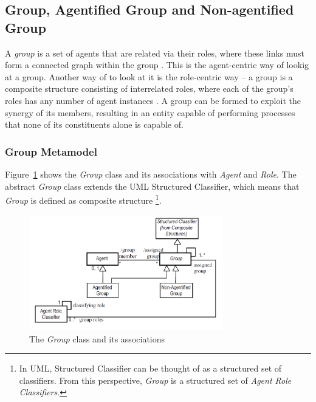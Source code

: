 \subsection{Group, Agentified Group and Non-agentified Group}

A \textit{group} is a set of agents that are related via their roles, where these links must form
a connected graph within the group \cite{Odell05}.
This is the agent-centric way of lookig at a group.
Another way of to look at it is the role-centric way -- a group is a composite structure consisting of interrelated roles, where each of the group's roles has any number of agent instances \cite{Odell05}.
A group can be formed to exploit the synergy of its members, resulting in an entity capable of performing processes that none of its constituents alone is capable of.

\subsubsection*{Group Metamodel}

Figure~\ref{figure:onp-group} shows the \textit{Group} class and its associations with \textit{Agent} and \textit{Role}.
The abstract \textit{Group} class extends the UML Structured Classifier, which means that \textit{Group} is defined as composite structure
\footnote{In UML, Structured Classifier can be thought of as a structured set of classifiers. From this perspective, \textit{Group} is a structured set of \textit{Agent Role Classifiers}.}.

\begin{figure}[ht]
	\centering
	\includegraphics[width=0.75\textwidth]{images/onp/group.png}
	\caption{The \textit{Group} class and its associations}
	\label{figure:onp-group}
\end{figure}

